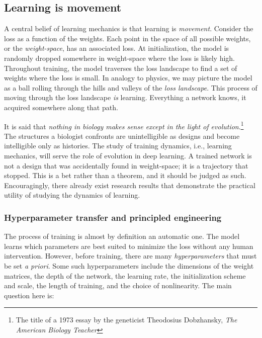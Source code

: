 \subsection{Learning is movement}
\label{questions}

A central belief of learning mechanics is that learning is \textit{movement}. Consider the loss as a function of the weights. Each point in the space of all possible weights, or the \textit{weight-space}, has an associated loss. At initialization, the model is randomly dropped somewhere in weight-space where the loss is likely high. Throughout training, the model traverses the loss landscape to find a set of weights where the loss is small. In analogy to physics, we may picture the model as a ball rolling through the hills and valleys of the \textit{loss landscape}. This process of moving through the loss landscape \textit{is} learning. Everything a network knows, it acquired somewhere along that path.

It is said that \textit{nothing in biology makes sense except in the light of evolution}.\footnote{The title of a 1973 essay by the geneticist Theodosius Dobzhansky, \textit{The American Biology Teacher}} The structures a biologist confronts are unintelligible as designs and become intelligible only as histories. The study of training dynamics, i.e., learning mechanics, will serve the role of evolution in deep learning. A trained network is not a design that was accidentally found in weight-space; it is a trajectory that stopped. This is a bet rather than a theorem, and it should be judged as such. Encouragingly, there already exist research results that demonstrate the practical utility of studying the dynamics of learning.

\subsubsection*{Hyperparameter transfer and principled engineering}

The process of training is almost by definition an automatic one. The model learns which parameters are best suited to minimize the loss without any human intervention. However, before training, there are many \textit{hyperparameters} that must be set \textit{a priori}. Some such hyperparameters include the dimensions of the weight matrices, the depth of the network, the learning rate, the initialization scheme and scale, the length of training, and the choice of nonlinearity. The main question here is:

